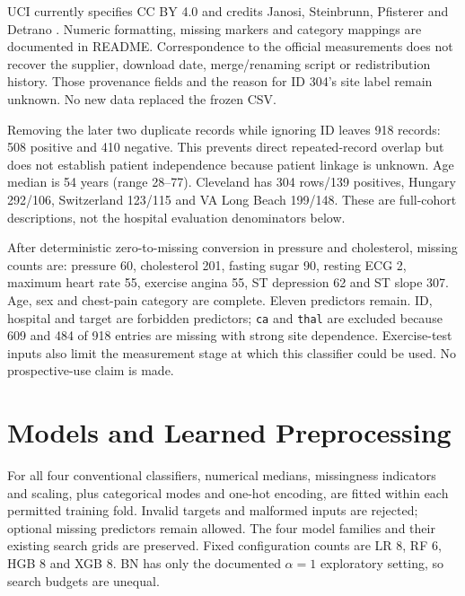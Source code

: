 \documentclass[conference]{IEEEtran}
\begin{document}
UCI currently specifies CC BY 4.0 and credits Janosi, Steinbrunn, Pfisterer and Detrano \cite{uci}. Numeric formatting, missing markers and category mappings are documented in README. Correspondence to the official measurements does not recover the supplier, download date, merge/renaming script or redistribution history. Those provenance fields and the reason for ID 304's site label remain unknown. No new data replaced the frozen CSV.

Removing the later two duplicate records while ignoring ID leaves 918 records: 508 positive and 410 negative. This prevents direct repeated-record overlap but does not establish patient independence because patient linkage is unknown. Age median is 54 years (range 28--77). Cleveland has 304 rows/139 positives, Hungary 292/106, Switzerland 123/115 and VA Long Beach 199/148. These are full-cohort descriptions, not the hospital evaluation denominators below.

After deterministic zero-to-missing conversion in pressure and cholesterol, missing counts are: pressure 60, cholesterol 201, fasting sugar 90, resting ECG 2, maximum heart rate 55, exercise angina 55, ST depression 62 and ST slope 307. Age, sex and chest-pain category are complete. Eleven predictors remain. ID, hospital and target are forbidden predictors; \texttt{ca} and \texttt{thal} are excluded because 609 and 484 of 918 entries are missing with strong site dependence. Exercise-test inputs also limit the measurement stage at which this classifier could be used. No prospective-use claim is made.

\section{Models and Learned Preprocessing}
For all four conventional classifiers, numerical medians, missingness indicators and scaling, plus categorical modes and one-hot encoding, are fitted within each permitted training fold. Invalid targets and malformed inputs are rejected; optional missing predictors remain allowed. The four model families and their existing search grids are preserved. Fixed configuration counts are LR 8, RF 6, HGB 8 and XGB 8. BN has only the documented $\alpha=1$ exploratory setting, so search budgets are unequal.
\end{document}
